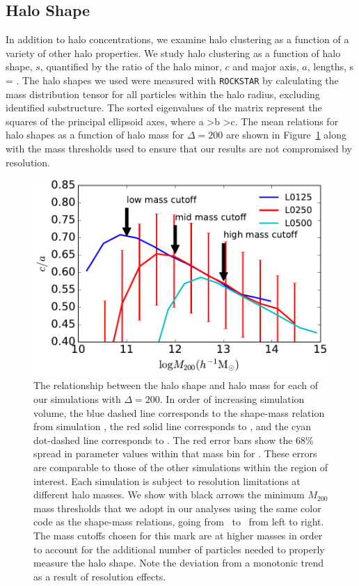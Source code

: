 \documentclass[usenatbib]{mnras}
\begin{document}
\subsection{Halo Shape}

In addition to halo concentrations, we examine halo clustering as a function of a variety of other 
halo properties. We study halo clustering as a function of halo shape, $s$, 
quantified by the ratio of the halo minor, $c$ and major axis, $a$, lengths, 
%
\beq
s = .
\eeq
%
The halo shapes we used were measured with {\tt ROCKSTAR} by calculating the mass distribution tensor for
all particles within the halo radius, excluding identified substructure. The sorted eigenvalues of the matrix represent
the squares of the principal ellipsoid axes, where a \textgreater b \textgreater c. 
The mean relations for halo shapes as a function of halo mass for $\Delta=200$ 
are shown in Figure~\ref{fig:srelation} along with the mass 
thresholds used to ensure that our results are not compromised by 
resolution.


\begin{figure}
\centering
\includegraphics[width=.5\textwidth]{masscut_shape_d200.pdf}
\caption{
The relationship between the halo shape and halo mass for each of our simulations with $\Delta =200$. 
In order of increasing simulation volume, the blue dashed line corresponds to the shape-mass relation from simulation 
\simA, the red solid line corresponds to \simB, and the cyan dot-dashed line corresponds to \simC. The red error bars show the 68\% spread in
parameter values within that mass bin for \simB. These errors are comparable to those of the other simulations
within the region of interest.
Each simulation is subject to resolution limitations at different halo masses. We show with black arrows 
the minimum $M_{200}$ mass thresholds that we adopt in our analyses using the same color code as 
the shape-mass relations, going from \simA \ to \simC \ from left to right. The mass cutoffs chosen for this mark
are at higher masses in order to account for the additional number of particles needed to properly measure the
halo shape. Note the deviation from a monotonic trend as a result of resolution effects.
}
\label{fig:srelation}
\end{figure}
\end{document}
